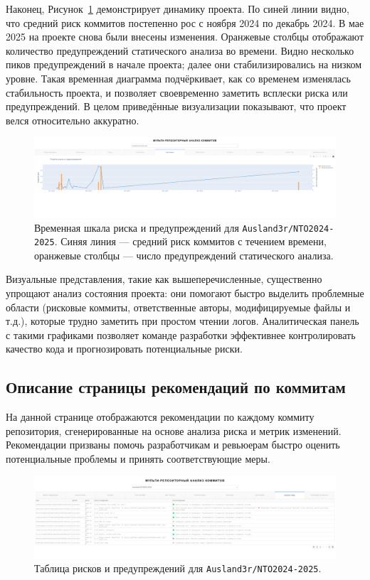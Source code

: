 \begin{itemize}
Наконец, Рисунок~\ref{fig:timeline} демонстрирует динамику проекта. По синей линии видно, что средний риск коммитов постепенно рос с ноября 2024 по декабрь 2024. В мае 2025 на проекте снова были внесены изменения. Оранжевые столбцы отображают количество предупреждений статического анализа во времени. Видно несколько пиков предупреждений в начале проекта; далее они стабилизировались на низком уровне. Такая временная диаграмма подчёркивает, как со временем изменялась стабильность проекта, и позволяет своевременно заметить всплески риска или предупреждений. В целом приведённые визуализации показывают, что проект велся относительно аккуратно. 



\begin{figure}[ht]
	\centering
	\includegraphics[width=\textwidth]{my_folder/images/fifth_page.png}
	\caption{Временная шкала риска и предупреждений для \texttt{Ausland3r/NTO2024-2025}. Синяя линия — средний риск коммитов с течением времени, оранжевые столбцы — число предупреждений статического анализа.}
	\label{fig:timeline}
\end{figure}

Визуальные представления, такие как вышеперечисленные, существенно упрощают анализ состояния проекта: они помогают быстро выделить проблемные области (рисковые коммиты, ответственные авторы, модифицируемые файлы и т.д.), которые трудно заметить при простом чтении логов. Аналитическая панель с такими графиками позволяет команде разработки эффективнее контролировать качество кода и прогнозировать потенциальные риски. 

\subsection{Описание страницы рекомендаций по коммитам}

На данной странице отображаются рекомендации по каждому коммиту репозитория, сгенерированные на основе анализа риска и метрик изменений. Рекомендации призваны помочь разработчикам и ревьюерам быстро оценить потенциальные проблемы и принять соответствующие меры.

\begin{figure}[ht]
	\centering
	\includegraphics[width=\textwidth]{my_folder/images/capa_page.png}
	\caption{Таблица рисков и предупреждений для \texttt{Ausland3r/NTO2024-2025}.}
	\label{fig:timeline123}
\end{figure}


\end{itemize}
